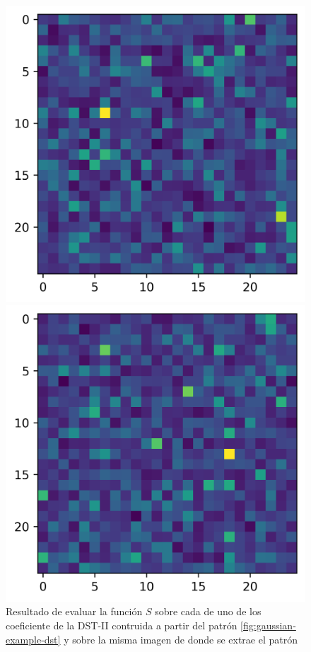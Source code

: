 \begin{figure}
\begin{multicols}{2}
    \end{multicols}
\begin{multicols}{2}
    \includegraphics[width=\linewidth]{Graphics/gaussian-example-vertical-dst.png}\par
    \includegraphics[width=\linewidth]{Graphics/guassian-example-diagonal-dst.png}\par
\end{multicols}
\caption{ Resultado de evaluar la función $S$ sobre cada de uno de los coeficiente de la DST-II contruida a partir del 
patrón \ref{fig:gaussian-example-dst} y sobre la misma imagen de donde se extrae el patrón}
\end{figure}

